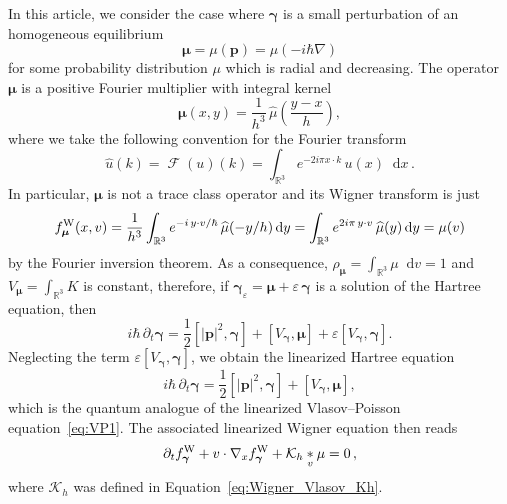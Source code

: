\documentclass[a4paper,12pt]{amsart} %
\theoremstyle{plain}
\theoremstyle{definition}
\newcommand		{\RR}		{\mathbb R}			%
\newcommand		{\R}		{\RR}
\newcommand		{\Rd}		{\R^3}
\newcommand		{\hd}		{h^3}
\newcommand		{\cK}		{\mathcal K}		%
\newcommand		{\lt}			{\left}				%
\newcommand		{\rt}			{\right}			%
\renewcommand	{\(}			{\lt(}
\renewcommand	{\)}			{\rt)}
\newcommand		{\com}[1]		{\lt[{#1}\rt]}		%
\newcommand		{\n}[1]			{\lt\lvert{#1}\rt\rvert}	%
\renewcommand		{\d}		{\mathop{}\!\mathrm{d}}		%
\newcommand			{\dpt}		{\partial_t}
\newcommand			{\Dx}		{\nabla_x}
\DeclareMathOperator{\cF}		{\mathcal{F}}		%
\newcommand		{\F}[1]			{\cF\!\( #1 \)}		%
\newcommand		{\intd}			{\int_{\Rd}}
\newcommand		{\eps}			{\varepsilon}
\newcommand	{\h}			{h}
\newcommand		{\opgam}		{{\boldsymbol{\gamma}}}
\newcommand		{\op}			{\opgam}	%
\newcommand		{\opmu}			{\boldsymbol{\mu}}	%
\newcommand	 {\Wigner}[1]		{f^\textnormal{W}_{#1}}
\newcommand		{\opp}			{\boldsymbol{p}}
\begin{document}
	In this article, we consider the case where $\op$ is a small perturbation of an homogeneous equilibrium
	\begin{equation}\label{eq:quantum_equilibrium}
		\opmu = \mu(\opp) = \mu(-i\hbar\nabla)
	\end{equation}
	for some probability distribution $\mu$ which is radial and decreasing. The operator $\opmu$ is a positive Fourier multiplier with integral kernel 
	\begin{equation*}
		\opmu(x,y) = \frac{1}{\hd} \,\widehat{\mu}\!\lt(\frac{y-x}{h}\rt),
	\end{equation*}
	where we take the following convention for the Fourier transform
	\begin{equation*}
		\widehat{u}(k) = \F{u}\!(k) = \intd e^{-2i\pi x\cdot k} \,u(x) \d x \, .
	\end{equation*}
	In particular, $\opmu$ is not a trace class operator and its Wigner transform is just
	\begin{equation*}
		\Wigner{\opmu}(x,v) = \frac{1}{\hd} \intd e^{-i\,y\cdot v/\hbar} \,\widehat{\mu}(-y/h)\d y = \intd e^{2i\pi\,y\cdot v} \,\widehat{\mu}(y)\d y = \mu(v)
	\end{equation*}
	by the Fourier inversion theorem. As a consequence, $\rho_{\opmu} = \intd \mu \d v = 1$ and $V_{\opmu} = \intd K$ is constant, therefore, if $\op_\eps = \opmu + \eps\,\op$ is a solution of the Hartree equation, then
	\begin{equation*} %
		i\hbar\, \dpt \op = \frac{1}{2}\com{\n{\opp}^2,\op} + \com{V_{\op},\opmu} + \eps \com{V_{\op},\op} .
	\end{equation*}
	Neglecting the term $\eps \com{V_{\op},\op}$, we obtain the linearized Hartree equation
	\begin{equation}\label{eq:Hartree_linear}
		i\hbar\, \dpt \op = \frac{1}{2}\com{\n{\opp}^2,\op} + \com{V_{\op},\opmu} ,
	\end{equation}
	which is the quantum analogue of the linearized Vlasov--Poisson equation~\eqref{eq:VP1}. The associated linearized Wigner equation then reads
	\begin{equation}\label{eq:linear_Wigner}
		\dpt \Wigner{\op} + v\cdot\Dx \Wigner{\op} + \cK_\h \underset{v}{*} \mu = 0 \, ,
	\end{equation}
	where $\cK_\h$ was defined in Equation~\eqref{eq:Wigner_Vlasov_Kh}.
	

\end{document}
